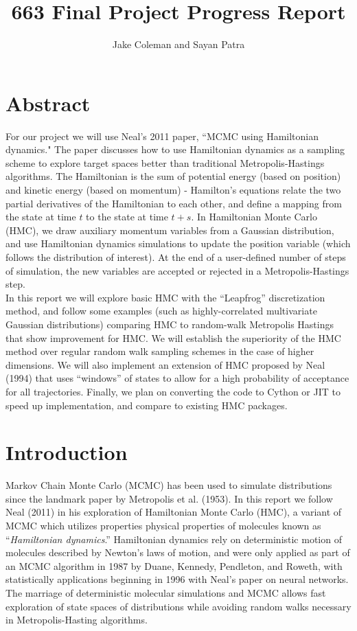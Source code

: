 \documentclass{article}
\title{663 Final Project Progress Report}
\author{Jake Coleman and Sayan Patra}
\date{}
\numberwithin{equation}{section}
\begin{document}
\maketitle

\section{Abstract}
For our project we will use Neal's 2011 paper, ``MCMC using Hamiltonian dynamics." The paper discusses how to use Hamiltonian dynamics as a sampling scheme to explore target spaces better than traditional Metropolis-Hastings algorithms. The Hamiltonian is the sum of potential energy (based on position) and kinetic energy (based on momentum) - Hamilton's equations relate the two partial derivatives of the Hamiltonian to each other, and define a mapping from the state at time $t$ to the state at time $t + s$. In Hamiltonian Monte Carlo (HMC), we draw auxiliary momentum variables from a Gaussian distribution, and use Hamiltonian dynamics simulations to update the position variable (which follows the distribution of interest). At the end of a user-defined number of steps of simulation, the new variables are accepted or rejected in a Metropolis-Hastings step.\\

In this report we will explore basic HMC with the ``Leapfrog'' discretization method, and follow some examples (such as highly-correlated multivariate Gaussian distributions) comparing HMC to random-walk Metropolis Hastings that show improvement for HMC. We will establish the superiority of the HMC method over regular random walk sampling schemes in the case of higher dimensions. We will also implement an extension of HMC proposed by Neal (1994) that uses ``windows'' of states to allow for a high probability of acceptance for all trajectories. Finally, we plan on converting the code to Cython or JIT to speed up implementation, and compare to existing HMC packages.

\section{Introduction}
Markov Chain Monte Carlo (MCMC) has been used to simulate distributions since the landmark paper by Metropolis et al. (1953). In this report we follow Neal (2011) in his exploration of Hamiltonian Monte Carlo (HMC), a variant of MCMC which utilizes properties physical properties of molecules known as ``\textit{Hamiltonian dynamics}.'' Hamiltonian dynamics rely on deterministic motion of molecules described by Newton's laws of motion, and were only applied as part of an MCMC algorithm in 1987 by Duane, Kennedy, Pendleton, and Roweth, with statistically applications beginning in 1996 with Neal's paper on neural networks.  The marriage of deterministic molecular simulations and MCMC allows fast exploration of state spaces of distributions while avoiding random walks necessary in Metropolis-Hasting algorithms.\\
\end{document}
